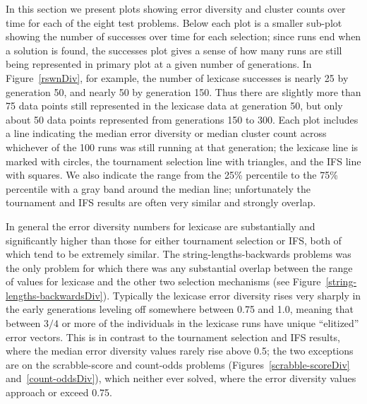 In this section we present plots showing error diversity and cluster counts over time for each of
the eight test problems. Below each plot is a smaller sub-plot showing the number of successes 
over time for each selection; since runs end when a solution is found, the successes plot gives a
sense of how many runs are still being represented in primary plot at a given number of generations.
In Figure~\ref{rswnDiv}, for example, the number of lexicase successes is nearly 25 by generation
50, and nearly 50 by generation 150. Thus there are slightly more than 75 data points still represented
in the lexicase data at generation 50, but only about 50 data points represented from generations 150
to 300. Each plot includes a line indicating the median error diversity or median cluster count across
whichever of the 100 runs was still running at that generation; the lexicase line is marked with circles,
the tournament selection line with triangles, and the IFS line with squares. We also indicate the 
range from the 25\% percentile to the 75\% percentile with a gray band around the median line; 
unfortunately the tournament and IFS results are often very similar and strongly overlap.

In general the error diversity numbers for lexicase are substantially and significantly
higher than those for either tournament selection or IFS, both of which tend to be extremely similar.
The string-lengths-backwards problems was the only problem for which there was any substantial overlap 
between the range of values for lexicase and the other two selection mechanisms (see 
Figure~\ref{string-lengths-backwardsDiv}). Typically the lexicase error diversity rises very sharply
in the early generations leveling off somewhere between 0.75 and 1.0, meaning that between $3/4$ or
more of the individuals in the lexicase runs have unique ``elitized'' error vectors. This is in contrast
to the tournament selection and IFS results, where the median error diversity values rarely rise above
0.5; the two exceptions are on the scrabble-score and count-odds problems 
(Figures~\ref{scrabble-scoreDiv} and~\ref{count-oddsDiv}), which neither ever
solved, where the error diversity values approach or exceed 0.75.

